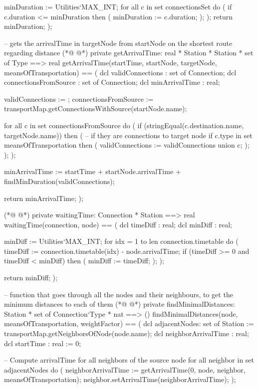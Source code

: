 \begin{vdmpp}[breaklines=true]
  minDuration := Utilities`MAX_INT;
  for all c in set connectionsSet do (
   if c.duration <= minDuration then (
    minDuration := c.duration;
   );
  );
  return minDuration;
 );
 
 -- gets the arrivalTime in targetNode from startNode on the shortest route regarding distance 
(*@
\label{getArrivalTime:73}
@*)
 private getArrivalTime: real * Station * Station * set of Type ==> real
 getArrivalTime(startTime, startNode, targetNode, meansOfTransportation) ==
 (
  dcl validConnections : set of Connection;
  dcl connectionsFromSource : set of Connection;
  dcl minArrivalTime : real;
  
  validConnections := {};
  connectionsFromSource := transportMap.getConnectionsWithSource(startNode.name);
  
  for all c in set connectionsFromSource do (
   if (stringEqual(c.destination.name, targetNode.name)) then ( -- if they are connections to target node 
     if c.type in set meansOfTransportation then (
      validConnections := validConnections union {c};
     );
   );
  );
  
  minArrivalTime := startTime + startNode.arrivalTime + findMinDuration(validConnections);
  
  return minArrivalTime;
 );
 
(*@
\label{waitingTime:96}
@*)
 private waitingTime: Connection * Station ==> real
 waitingTime(connection, node) ==
 (
  dcl timeDiff : real;
  dcl minDiff : real;
  
  minDiff := Utilities`MAX_INT;
  for idx = 1 to len connection.timetable do (
   timeDiff := connection.timetable(idx) - node.arrivalTime;
   if (timeDiff >= 0 and timeDiff < minDiff) then (
    minDiff := timeDiff;
   );
  );
  
  return minDiff;
 );
 
 -- function that goes through all the nodes and their neighbours, to get the minimum distances to each of them
(*@
\label{findMinimalDistances:114}
@*)
 private findMinimalDistances: Station * set of Connection`Type * nat ==> () 
 findMinimalDistances(node, meansOfTransportation, weightFactor) ==
 (
  dcl adjacentNodes: set of Station := transportMap.getNeighborsOfNode(node.name);
  dcl neighborArrivalTime : real;
  dcl startTime : real := 0;
    
  -- Compute arrivalTime for all neighbors of the source node
  for all neighbor in set adjacentNodes do (
   neighborArrivalTime := getArrivalTime(0, node, neighbor, meansOfTransportation);
   neighbor.setArrivalTime(neighborArrivalTime);
  );


\end{vdmpp}

